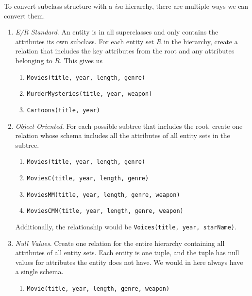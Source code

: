 \documentclass{article}
\begin{document}
    \begin{theorem}
      To convert subclass structure with a \textit{isa} hierarchy, there are multiple ways we can convert them. 
      \begin{enumerate}
        \item \textit{E/R Standard}. An entity is in all superclasses and only contains the attributes its own subclass. For each entity set $R$ in the hierarchy, create a relation that includes the key attributes from the root and any attributes belonging to $R$. This gives us 
          \begin{enumerate}
            \item \texttt{Movies(title, year, length, genre)}
            \item \texttt{MurderMysteries(title, year, weapon)}
            \item \texttt{Cartoons(title, year)}
          \end{enumerate}
        \item \textit{Object Oriented}. For each possible subtree that includes the root, create one relation whose schema includes all the attributes of all entity sets in the subtree.
          \begin{enumerate}
            \item \texttt{Movies(title, year, length, genre)} 
            \item \texttt{MoviesC(title, year, length, genre)} 
            \item \texttt{MoviesMM(title, year, length, genre, weapon)}
            \item \texttt{MoviesCMM(title, year, length, genre, weapon)}
          \end{enumerate}
          Additionally, the relationship would be \texttt{Voices(title, year, starName)}. 
        \item \textit{Null Values}. Create one relation for the entire hierarchy containing all attributes of all entity sets. Each entity is one tuple, and the tuple has null values for attributes the entity does not have. We would in here always have a single schema. 
          \begin{enumerate}
            \item \texttt{Movie(title, year, length, genre, weapon)}
          \end{enumerate}
      \end{enumerate}
    \end{theorem}
\end{document}
